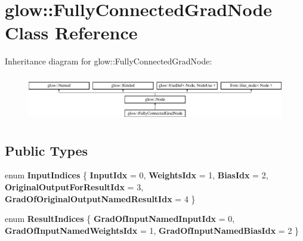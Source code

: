 \hypertarget{classglow_1_1_fully_connected_grad_node}{}\section{glow\+:\+:Fully\+Connected\+Grad\+Node Class Reference}
\label{classglow_1_1_fully_connected_grad_node}
Inheritance diagram for glow\+:\+:Fully\+Connected\+Grad\+Node\+:\begin{figure}[H]
\begin{center}
\leavevmode
\includegraphics[height=2.028986cm]{classglow_1_1_fully_connected_grad_node}
\end{center}
\end{figure}
\subsection*{Public Types}
\begin{DoxyCompactItemize}
\item 
\mbox{\label{classglow_1_1_fully_connected_grad_node_a14f54af708e16d74c423d734062198f0}} 
enum {\bfseries Input\+Indices} \{ \newline
{\bfseries Input\+Idx} = 0, 
{\bfseries Weights\+Idx} = 1, 
{\bfseries Bias\+Idx} = 2, 
{\bfseries Original\+Output\+For\+Result\+Idx} = 3, 
\newline
{\bfseries Grad\+Of\+Original\+Output\+Named\+Result\+Idx} = 4
 \}
\item 
\mbox{\label{classglow_1_1_fully_connected_grad_node_a10a17ad68ac7500d1a64c55180f079d0}} 
enum {\bfseries Result\+Indices} \{ {\bfseries Grad\+Of\+Input\+Named\+Input\+Idx} = 0, 
{\bfseries Grad\+Of\+Input\+Named\+Weights\+Idx} = 1, 
{\bfseries Grad\+Of\+Input\+Named\+Bias\+Idx} = 2
 \}
\end{DoxyCompactItemize}
